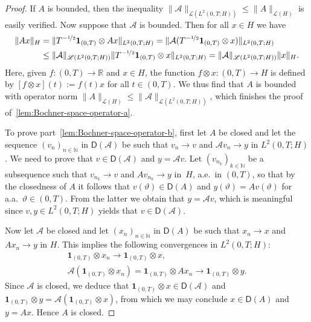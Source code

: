 \documentclass[10pt,a4paper]{amsart}
\newcommand{\N}{\mathbb{N}}
\newcommand{\R}{\mathbb{R}}
\newcommand{\from}{\colon}
\newcommand{\norm}[2]{     \| #1       \|_{ #2 }}
\begin{document}
\begin{proof}
	If $A$ is bounded, 
	then the inequality 
	$\norm{\mathcal A}{\mathscr L(L^2(0,T;H))} 
	\leq 
	\norm{A}{\mathscr L(H)}$ 
	is easily verified.
	Now suppose that $\mathcal A$ is bounded. 
	Then for all $x \in H$ we have
	\begin{align*}
	\norm{Ax}{H} 
	&= 
	\norm{T^{-\nicefrac{1}{2}}\mathbf 1_{(0,T)} \otimes Ax}{L^2(0,T;H)} 
	= 
	\norm{\mathcal A(T^{-\nicefrac{1}{2}}\mathbf 1_{(0,T)} \otimes x)}{L^2(0,T;H)} 
	\\
	&\leq 
	\norm{\mathcal A}{\mathscr L(L^2(0,T;H))} 
	\norm{T^{-\nicefrac{1}{2}}\mathbf 1_{(0,T)} \otimes x}{L^2(0,T;H)} 
	= \norm{\mathcal A}{\mathscr L(L^2(0,T;H))} \norm{x}{H}.
	\end{align*} 
	Here, given $f \from (0,T)\to \R$ and $x \in H$,
	the function $f \otimes x \from (0,T)\to H$ is 
	defined by $[f\otimes x](t) := f(t)x$ for all $t \in (0,T)$.
	We thus find that $A$ is bounded 
	with operator norm  
	$\norm{A}{\mathscr L(H)}
	\leq \norm{\mathcal A}{\mathscr L(L^2(0,T;H))}$,
	which finishes the proof of~\ref{lem:Bochner-space-operator-a}. 
	
	To prove 
	part~\ref{lem:Bochner-space-operator-b}, 
	first let $A$ be closed and let the sequence 
	$(v_n)_{n\in\N}$ in $ \mathsf D(\mathcal A)$ 
	be such that $v_n \to v$ and $\mathcal Av_n \to y$ 
	in $L^2(0,T;H)$. We need to prove that 
	$v \in \mathsf D(\mathcal A)$ and 
	$y = \mathcal Av$. Let $(v_{n_k})_{k\in\N}$ 
	be a subsequence such that 
	$v_{n_k} \to v$ 
	and $Av_{n_k} \to y$ in~$H$, 
	a.e.\ in $(0,T)$, 
	so that by the closedness of $A$ it follows that 
	$v(\vartheta) \in \mathsf D(A)$ and $y(\vartheta) = Av(\vartheta)$ 
	for a.a.\ $\vartheta\in(0,T)$. 
	From the latter we obtain that $y = \mathcal Av$, 
	which is meaningful since $v,y\in L^2(0,T;H)$ 
	yields that $v \in \mathsf D(\mathcal A)$.
	
	Now let $\mathcal A$ be closed and 
	let $(x_n)_{n\in \N}$ in $\mathsf D(A)$ 
	be such that $x_n \to x$ and $Ax_n \to y$ in $H$. 
	This implies the following convergences in 
	$L^2(0,T;H)$: 
	\begin{align*}
	\mathbf 1_{(0,T)} \otimes x_n 
	\to \mathbf 1_{(0,T)}\otimes x, 
	\\ 
	\mathcal A(\mathbf 1_{(0,T)} \otimes x_n) 
	= 
	\mathbf 1_{(0,T)} \otimes Ax_n  
	\to \mathbf 1_{(0,T)} \otimes y. 
	\end{align*}
	Since $\mathcal A$ is closed, 
	we deduce that 
	$\mathbf 1_{(0,T)} \otimes x \in \mathsf D(\mathcal A)$ 
	and $\mathbf 1_{(0,T)} \otimes y = \mathcal A(\mathbf 1_{(0,T)} \otimes x)$, 
	from which we may conclude $x \in \mathsf D(A)$ and $y = Ax$. 
	Hence $A$ is closed.
\end{proof}
\end{document}
